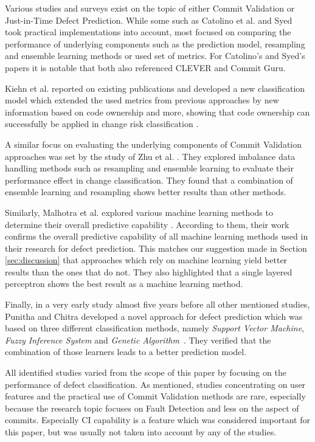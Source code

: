 Various studies and surveys exist
on the topic of either Commit Validation or Just-in-Time Defect Prediction. While some such as Catolino et al. \cite{Catolino2019} and Syed \cite{Syed2019} took practical implementations into account, most focused on comparing the performance of underlying components such as the prediction model, resampling and ensemble learning methods or used set of metrics. For Catolino's and Syed's papers it is notable that both also referenced CLEVER and Commit Guru.

Kiehn et al. reported on existing publications and developed a new classification model which extended the used metrics from previous approaches by new information based on code ownership and more, showing that code ownership can successfully be applied in change risk classification \cite{Kiehn2019}.

A similar focus on evaluating the underlying components of Commit Validation approaches was set by the study of Zhu et al. \cite{Zhu2018}. They explored imbalance data handling methods such as resampling and ensemble learning to evaluate their performance effect in change classification. They found that a combination of ensemble learning and resampling shows better results than other methods. 

Similarly, Malhotra et al. explored various machine learning methods to determine their overall predictive capability \cite{Malhotra2017}. According to them, their work confirms the overall predictive capability of all machine learning methods used in their research for defect prediction. This matches our suggestion made in Section \ref{sec:discussion} that approaches which rely on machine learning yield better results than the ones that do not. They also highlighted that a single layered perceptron shows the best result as a machine learning method.

Finally, in a very early study almost five years before all other mentioned studies, Punitha and Chitra developed a novel approach for defect prediction which was based on three different classification methods, namely \textit{Support Vector Machine}, \textit{Fuzzy Inference System} and \textit{Genetic Algorithm}~\cite{Punitha2013}. They verified that the combination of those learners leads to a better prediction model.

All identified studies varied from the scope of this paper by focusing on the performance of defect classification. As mentioned, studies concentrating on user features and the practical use of Commit Validation methods are rare, especially because the research topic focuses on Fault Detection and less on the aspect of commits. Especially CI capability is a feature which was considered important for this paper, but was usually not taken into account by any of the studies.

